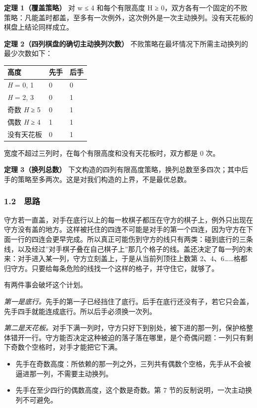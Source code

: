 \documentclass[
  a4paper,
]{article}
\newcounter{none} %
\providecommand{\tightlist}{%
  \setlength{\itemsep}{0pt}\setlength{\parskip}{0pt}}
\begin{document}
\textbf{定理 1（覆盖策略）} 对 w ≤ 4 和每个有限高度 H ≥
0，双方各有一个固定的不败策略：凡能盖时都盖，至多有一次例外，这次例外是一次主动换列。没有天花板的棋盘上结论同样成立。

\textbf{定理 2（四列棋盘的确切主动换列次数）}
不败策略在最坏情况下所需主动换列的最少次数如下：

{\def\LTcaptype{none} %
\begin{longtable}[]{@{}lll@{}}
\toprule\noalign{}
高度 & 先手 & 后手 \\
\midrule\noalign{}
\endhead
\bottomrule\noalign{}
\endlastfoot
\emph{H} = 0, 1 & 0 & 0 \\
\emph{H} = 2, 3 & 0 & 1 \\
奇数 \emph{H} ≥ 5 & 0 & 1 \\
偶数 \emph{H} ≥ 4 & 1 & 1 \\
没有天花板 & 0 & 1 \\
\end{longtable}
}

宽度不超过三列时，在每个有限高度和没有天花板时，双方都是 0 次。

\textbf{定理 3（换列总数）}
下文构造的四列有限高度策略，换列总数至多四次；其中后手的策略至多两次。这是对我们构造的上界，不是最优总数。

\subsubsection{1.2 思路}\label{ux601dux8def}

守方若一直盖，对手在底行以上的每一枚棋子都压在守方的棋子上，例外只出现在守方没有盖的地方。这样被托住的四连不可能是对手的第一个四连，因为守方在下面一行的四连会更早完成。所以真正可能伤到守方的线只有两类：碰到底行的三条线，以及经过''对手棋子叠在自己棋子上''那几个格子的线。盖还决定了每一列的未来：对手进入某一列，守方立刻盖上，于是从当前列顶往上数第
2、4、6\ldots\ldots 格都归守方。只要给每条危险的线找一个这样的格子，并守住它，就够了。

有两件事会破坏这个计划。

\emph{第一是底行。}先手的第一子已经挡住了底行。后手在底行还没有子，若它只会盖，先手四手就能连成底行。所以后手必须换一次列。

\emph{第二是天花板。}对手下满一列时，守方只好下到别处，被下进的那一列，保护格整体错开一行。守方能否决定这种被迫的落子落在哪里，是个奇偶问题：一列只有剩下奇数个空格时，对手才能把它下满。

\begin{itemize}
\tightlist
\item
  先手在奇数高度：所依赖的那一列之外，三列共有偶数个空格，先手从不会被逼进那一列，不需要主动换列。
\item
  先手在至少四行的偶数高度，这个数是奇数。第 7
  节的反制说明，一次主动换列不可避免。
\end{itemize}
\end{document}
